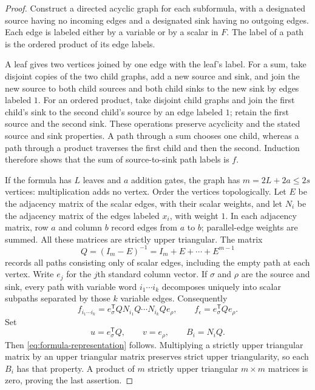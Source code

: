 \begin{proof}
Construct a directed acyclic graph for each subformula, with a designated
source having no incoming edges and a designated sink having no outgoing
edges.  Each edge is labeled either by a variable or by a scalar in $F$.
The label of a path is the ordered product of its edge labels.

A leaf gives two vertices joined by one edge with the leaf's label.
For a sum, take disjoint copies of the two child graphs, add a new source
and sink, and join the new source to both child sources and both child
sinks to the new sink by edges labeled $1$.  For an ordered product,
take disjoint child graphs and join the first child's sink to the second
child's source by an edge labeled $1$; retain the first source and the
second sink.  These operations preserve acyclicity and the stated
source and sink properties.  A path through a sum chooses one child,
whereas a path through a product traverses the first child and then the
second.  Induction therefore shows that the sum of source-to-sink path
labels is $f$.

If the formula has $L$ leaves and $a$ addition gates, the graph has
$m=2L+2a\le2s$ vertices: multiplication adds no vertex.  Order the
vertices topologically.  Let $E$ be the adjacency matrix of the scalar
edges, with their scalar weights, and let $N_i$ be the adjacency matrix
of the edges labeled $x_i$, with weight $1$.  In each adjacency matrix,
row $a$ and column $b$ record edges from $a$ to $b$; parallel-edge weights
are summed.  All these matrices are strictly upper triangular.  The matrix
\[
 Q=(I_m-E)^{-1}=I_m+E+\cdots+E^{m-1}
\]
records all paths consisting only of scalar edges, including the empty
path at each vertex.  Write $e_j$ for the $j$th standard column vector.
If $\sigma$ and $\rho$ are the source and sink,
every path with variable word $i_1\cdots i_k$ decomposes uniquely into
scalar subpaths separated by those $k$ variable edges.  Consequently
\[
 f_{i_1\cdots i_k}
 =e_\sigma^{\mathsf T}Q N_{i_1}Q\cdots N_{i_k}Qe_\rho,
 \qquad
 f_\epsilon=e_\sigma^{\mathsf T}Qe_\rho.
\]
Set
\[
 u=e_\sigma^{\mathsf T}Q,\qquad v=e_\rho,
 \qquad B_i=N_iQ.
\]
Then \eqref{eq:formula-representation} follows.  Multiplying a strictly
upper triangular matrix by an upper triangular matrix preserves strict
upper triangularity, so each $B_i$ has that property.  A product of $m$
strictly upper triangular $m\times m$ matrices is zero, proving the
last assertion.
\end{proof}

